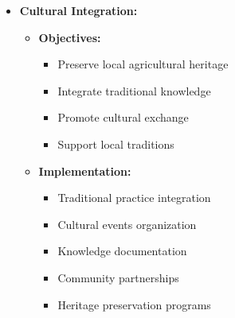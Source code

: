 \begin{itemize}
    \item \textbf{Cultural Integration:}
    \begin{itemize}
        \item \textbf{Objectives:}
        \begin{itemize}
            \item Preserve local agricultural heritage
            \item Integrate traditional knowledge
            \item Promote cultural exchange
            \item Support local traditions
        \end{itemize}
        \item \textbf{Implementation:}
        \begin{itemize}
            \item Traditional practice integration
            \item Cultural events organization
            \item Knowledge documentation
            \item Community partnerships
            \item Heritage preservation programs
        \end{itemize}
    \end{itemize}
\end{itemize}

